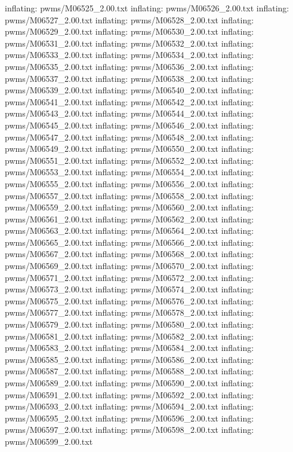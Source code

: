 \documentclass[letterpaper,10pt,english]{sphinxmanual}
\begin{document}
{\begin{sphinxVerbatim}[commandchars=\\\{\}]
  inflating: pwms/M06525\_2.00.txt
  inflating: pwms/M06526\_2.00.txt
  inflating: pwms/M06527\_2.00.txt
  inflating: pwms/M06528\_2.00.txt
  inflating: pwms/M06529\_2.00.txt
  inflating: pwms/M06530\_2.00.txt
  inflating: pwms/M06531\_2.00.txt
  inflating: pwms/M06532\_2.00.txt
  inflating: pwms/M06533\_2.00.txt
  inflating: pwms/M06534\_2.00.txt
  inflating: pwms/M06535\_2.00.txt
  inflating: pwms/M06536\_2.00.txt
  inflating: pwms/M06537\_2.00.txt
  inflating: pwms/M06538\_2.00.txt
  inflating: pwms/M06539\_2.00.txt
  inflating: pwms/M06540\_2.00.txt
  inflating: pwms/M06541\_2.00.txt
  inflating: pwms/M06542\_2.00.txt
  inflating: pwms/M06543\_2.00.txt
  inflating: pwms/M06544\_2.00.txt
  inflating: pwms/M06545\_2.00.txt
  inflating: pwms/M06546\_2.00.txt
  inflating: pwms/M06547\_2.00.txt
  inflating: pwms/M06548\_2.00.txt
  inflating: pwms/M06549\_2.00.txt
  inflating: pwms/M06550\_2.00.txt
  inflating: pwms/M06551\_2.00.txt
  inflating: pwms/M06552\_2.00.txt
  inflating: pwms/M06553\_2.00.txt
  inflating: pwms/M06554\_2.00.txt
  inflating: pwms/M06555\_2.00.txt
  inflating: pwms/M06556\_2.00.txt
  inflating: pwms/M06557\_2.00.txt
  inflating: pwms/M06558\_2.00.txt
  inflating: pwms/M06559\_2.00.txt
  inflating: pwms/M06560\_2.00.txt
  inflating: pwms/M06561\_2.00.txt
  inflating: pwms/M06562\_2.00.txt
  inflating: pwms/M06563\_2.00.txt
  inflating: pwms/M06564\_2.00.txt
  inflating: pwms/M06565\_2.00.txt
  inflating: pwms/M06566\_2.00.txt
  inflating: pwms/M06567\_2.00.txt
  inflating: pwms/M06568\_2.00.txt
  inflating: pwms/M06569\_2.00.txt
  inflating: pwms/M06570\_2.00.txt
  inflating: pwms/M06571\_2.00.txt
  inflating: pwms/M06572\_2.00.txt
  inflating: pwms/M06573\_2.00.txt
  inflating: pwms/M06574\_2.00.txt
  inflating: pwms/M06575\_2.00.txt
  inflating: pwms/M06576\_2.00.txt
  inflating: pwms/M06577\_2.00.txt
  inflating: pwms/M06578\_2.00.txt
  inflating: pwms/M06579\_2.00.txt
  inflating: pwms/M06580\_2.00.txt
  inflating: pwms/M06581\_2.00.txt
  inflating: pwms/M06582\_2.00.txt
  inflating: pwms/M06583\_2.00.txt
  inflating: pwms/M06584\_2.00.txt
  inflating: pwms/M06585\_2.00.txt
  inflating: pwms/M06586\_2.00.txt
  inflating: pwms/M06587\_2.00.txt
  inflating: pwms/M06588\_2.00.txt
  inflating: pwms/M06589\_2.00.txt
  inflating: pwms/M06590\_2.00.txt
  inflating: pwms/M06591\_2.00.txt
  inflating: pwms/M06592\_2.00.txt
  inflating: pwms/M06593\_2.00.txt
  inflating: pwms/M06594\_2.00.txt
  inflating: pwms/M06595\_2.00.txt
  inflating: pwms/M06596\_2.00.txt
  inflating: pwms/M06597\_2.00.txt
  inflating: pwms/M06598\_2.00.txt
  inflating: pwms/M06599\_2.00.txt

\end{sphinxVerbatim}}
\end{document}
